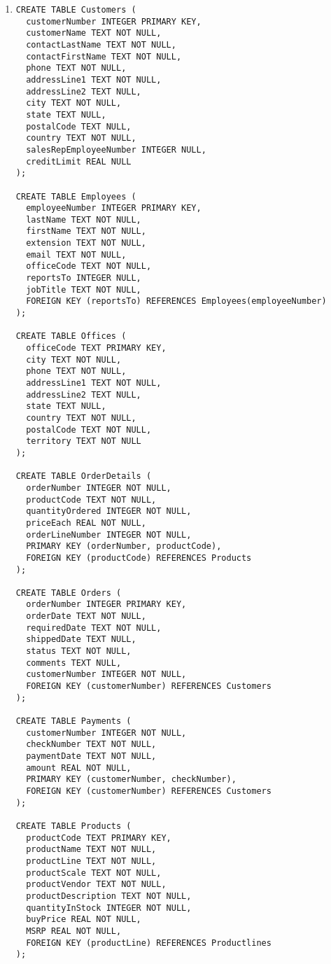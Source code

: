 


  \begin{enumerate}

  \item 
  \begin{verbatim}
CREATE TABLE Customers (
  customerNumber INTEGER PRIMARY KEY,
  customerName TEXT NOT NULL,
  contactLastName TEXT NOT NULL,
  contactFirstName TEXT NOT NULL,
  phone TEXT NOT NULL,
  addressLine1 TEXT NOT NULL,
  addressLine2 TEXT NULL,
  city TEXT NOT NULL,
  state TEXT NULL,
  postalCode TEXT NULL,
  country TEXT NOT NULL,
  salesRepEmployeeNumber INTEGER NULL,
  creditLimit REAL NULL
);

CREATE TABLE Employees (
  employeeNumber INTEGER PRIMARY KEY,
  lastName TEXT NOT NULL,
  firstName TEXT NOT NULL,
  extension TEXT NOT NULL,
  email TEXT NOT NULL,
  officeCode TEXT NOT NULL,
  reportsTo INTEGER NULL,
  jobTitle TEXT NOT NULL,
  FOREIGN KEY (reportsTo) REFERENCES Employees(employeeNumber)
);

CREATE TABLE Offices (
  officeCode TEXT PRIMARY KEY,
  city TEXT NOT NULL,
  phone TEXT NOT NULL,
  addressLine1 TEXT NOT NULL,
  addressLine2 TEXT NULL,
  state TEXT NULL,
  country TEXT NOT NULL,
  postalCode TEXT NOT NULL,
  territory TEXT NOT NULL
);

CREATE TABLE OrderDetails (
  orderNumber INTEGER NOT NULL,
  productCode TEXT NOT NULL,
  quantityOrdered INTEGER NOT NULL,
  priceEach REAL NOT NULL,
  orderLineNumber INTEGER NOT NULL,
  PRIMARY KEY (orderNumber, productCode),
  FOREIGN KEY (productCode) REFERENCES Products
);

CREATE TABLE Orders (
  orderNumber INTEGER PRIMARY KEY,
  orderDate TEXT NOT NULL,
  requiredDate TEXT NOT NULL,
  shippedDate TEXT NULL,
  status TEXT NOT NULL,
  comments TEXT NULL,
  customerNumber INTEGER NOT NULL,
  FOREIGN KEY (customerNumber) REFERENCES Customers
);

CREATE TABLE Payments (
  customerNumber INTEGER NOT NULL,  
  checkNumber TEXT NOT NULL,
  paymentDate TEXT NOT NULL,
  amount REAL NOT NULL,
  PRIMARY KEY (customerNumber, checkNumber),
  FOREIGN KEY (customerNumber) REFERENCES Customers
);

CREATE TABLE Products (
  productCode TEXT PRIMARY KEY,
  productName TEXT NOT NULL,
  productLine TEXT NOT NULL,
  productScale TEXT NOT NULL,
  productVendor TEXT NOT NULL,
  productDescription TEXT NOT NULL,
  quantityInStock INTEGER NOT NULL,
  buyPrice REAL NOT NULL,
  MSRP REAL NOT NULL,
  FOREIGN KEY (productLine) REFERENCES Productlines
);


\end{verbatim}
\end{enumerate}
